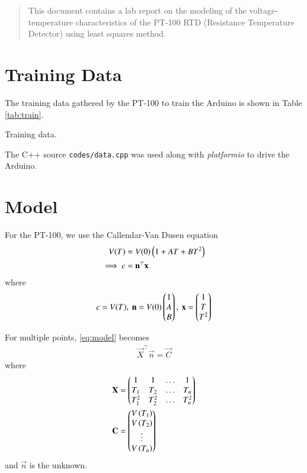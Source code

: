 \documentclass[journal,12pt,twocolumn]{IEEEtran}
\begin{document}
\begin{abstract}
    This document contains a lab report on the modeling of the voltage-temperature
    characteristics of the PT-100 RTD (Resistance Temperature Detector) using
    least squares method.
\end{abstract}

\section{Training Data}
The training data gathered by the PT-100 to train the Arduino is shown in Table 
\ref{tab:train}.

\begin{table}[!ht]
    \centering
    
    \caption{Training data.}
    \label{tab:train}
\end{table}

The C++ source \texttt{codes/data.cpp} was used along with \textit{platformio}
to drive the Arduino.

\section{Model}

For the PT-100, we use the Callendar-Van Dusen equation
\begin{align}
    V(T) &= V(0)\left(1+AT+BT^2\right) \\
    \implies c &= \boldsymbol{\mathbf{n}}^\top\boldsymbol{\mathbf{x}} \label{eq:model}
\end{align}
where
\begin{align}
    c = V(T),\ \boldsymbol{\mathbf{n}} = V(0)\begin{pmatrix}1\\A\\B\end{pmatrix},\ \boldsymbol{\mathbf{x}} = \begin{pmatrix}1\\T\\T^2\end{pmatrix}
    \label{eq:x-y-theta-def}
\end{align}

For multiple points, \eqref{eq:model} becomes
\begin{align}
    \vec{X}^\top\vec{n} = \vec{C}
    \label{eq:lsq-eqn}
\end{align}
where
\begin{align}
    \boldsymbol{\mathbf{X}} &= \begin{pmatrix}1&1&\ldots&1\\T_1&T_2&\ldots&T_n\\T_1^2&T_2^2&\ldots&T_n^2\end{pmatrix} \\
    \boldsymbol{\mathbf{C}} &= \begin{pmatrix}V\left(T_1\right)\\V\left(T_2\right)\\\vdots\\V\left(T_n\right)\end{pmatrix}
\end{align}
and $\vec{n}$ is the unknown.
\end{document}
